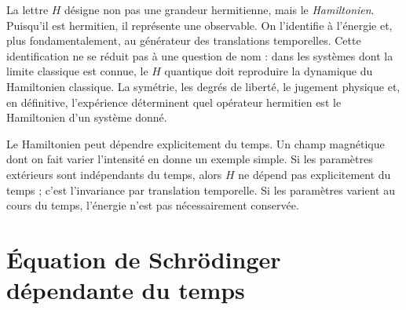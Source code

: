 La lettre \(H\) désigne non pas une grandeur hermitienne, mais le \emph{Hamiltonien}. Puisqu’il est hermitien, il représente une observable. On l’identifie à l’énergie et, plus fondamentalement, au générateur des translations temporelles. Cette identification ne se réduit pas à une question de nom : dans les systèmes dont la limite classique est connue, le \(H\) quantique doit reproduire la dynamique du Hamiltonien classique. La symétrie, les degrés de liberté, le jugement physique et, en définitive, l’expérience déterminent quel opérateur hermitien est le Hamiltonien d’un système donné.

\begin{classroomqa}
\end{classroomqa}

Le Hamiltonien peut dépendre explicitement du temps. Un champ magnétique dont on fait varier l’intensité en donne un exemple simple. Si les paramètres extérieurs sont indépendants du temps, alors \(H\) ne dépend pas explicitement du temps ; c’est l’invariance par translation temporelle. Si les paramètres varient au cours du temps, l’énergie n’est pas nécessairement conservée.

\begin{classroomqa}
\end{classroomqa}

\section{Équation de Schr\"odinger dépendante du temps}

